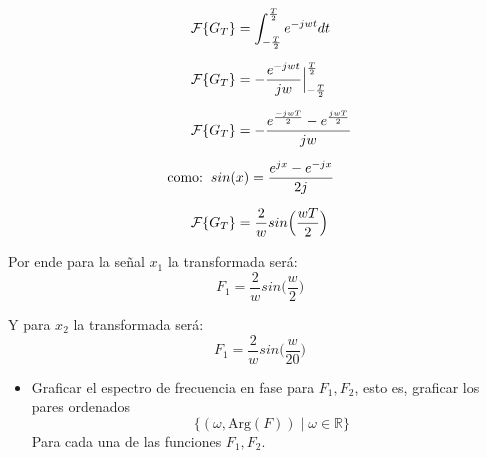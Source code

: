 \documentclass[12pt,a4paper]{report}
\begin{document}
\begin{enumerate}[label=\alph*),left=0pt]
    $$
    \begin{aligned}
      \mathcal{F}\{G_T\} &= \int_{-\frac{T}{2}}^{\frac{T}{2}}e^{-jwt}dt \\[6pt]
      \mathcal{F}\{G_T\} &= -\frac{e^{-jwt}}{jw}\Big|^{\frac{T}{2}}_{-\frac{T}{2}} \\[6pt]
      \mathcal{F}\{G_T\} &= -\frac{e^{\frac{-jwT}{2}}-e^{\frac{jwT}{2}}}{jw}\\[6pt]
      \text{como:} \hspace{2mm} sin(&x)=\frac{e^{jx}-e^{-jx}}{2j}\\[6pt]
      \mathcal{F}\{G_T\} &= \frac{2}{w}sin\Big(\frac{wT}{2}\Big)
    \end{aligned}
    $$

    Por ende para la señal $x_1$ la transformada será:
    $$F_1= \frac{2}{w}sin\Big(\frac{w}{2}\Big)$$

    Y para $x_2$ la transformada será:
    $$F_1= \frac{2}{w}sin\Big(\frac{w}{20}\Big)$$

    \begin {itemize}[left=0pt]

      \item Graficar el espectro de frecuencia en fase para $F_1, F_2$, esto es, graficar los pares ordenados
        $$\{(\omega, \text{Arg}(F)) \mid \omega \in \mathbb{R}\}$$
        Para cada una de las funciones $F_1, F_2$.\newline


\end{itemize}
\end{enumerate}
\end{document}
